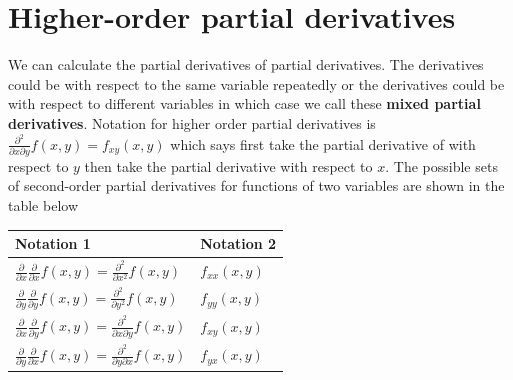 \documentclass[
]{book}
\theoremstyle{definition}
\theoremstyle{definition}
\theoremstyle{definition}
\theoremstyle{remark}
\begin{document}
\hypertarget{higher-order-partial-derivatives}{%
\section{Higher-order partial derivatives}\label{higher-order-partial-derivatives}}

We can calculate the partial derivatives of partial derivatives. The derivatives could be with respect to the same variable repeatedly or the derivatives could be with respect to different variables in which case we call these \textbf{mixed partial derivatives}. Notation for higher order partial derivatives is \(\frac{\partial^2}{\partial x \partial y} f(x, y) = f_{xy}(x, y)\) which says first take the partial derivative of with respect to \(y\) then take the partial derivative with respect to \(x\). The possible sets of second-order partial derivatives for functions of two variables are shown in the table below

\begin{longtable}[]{@{}ll@{}}
\toprule
\begin{minipage}[b]{0.47\columnwidth}\raggedright
Notation 1\strut
\end{minipage} & \begin{minipage}[b]{0.47\columnwidth}\raggedright
Notation 2\strut
\end{minipage}\tabularnewline
\midrule
\endhead
\begin{minipage}[t]{0.47\columnwidth}\raggedright
\(\frac{\partial}{\partial x}\frac{\partial}{\partial x} f(x, y) = \frac{\partial^2}{\partial x^2} f(x, y)\)\strut
\end{minipage} & \begin{minipage}[t]{0.47\columnwidth}\raggedright
\(f_{xx}(x, y)\)\strut
\end{minipage}\tabularnewline
\begin{minipage}[t]{0.47\columnwidth}\raggedright
\(\frac{\partial}{\partial y}\frac{\partial}{\partial y} f(x, y) = \frac{\partial^2}{\partial y^2} f(x, y)\)\strut
\end{minipage} & \begin{minipage}[t]{0.47\columnwidth}\raggedright
\(f_{yy}(x, y)\)\strut
\end{minipage}\tabularnewline
\begin{minipage}[t]{0.47\columnwidth}\raggedright
\(\frac{\partial}{\partial x}\frac{\partial}{\partial y} f(x, y) = \frac{\partial^2}{\partial x \partial y} f(x, y)\)\strut
\end{minipage} & \begin{minipage}[t]{0.47\columnwidth}\raggedright
\(f_{xy}(x, y)\)\strut
\end{minipage}\tabularnewline
\begin{minipage}[t]{0.47\columnwidth}\raggedright
\(\frac{\partial}{\partial y}\frac{\partial}{\partial x} f(x, y) = \frac{\partial^2}{\partial y \partial x} f(x, y)\)\strut
\end{minipage} & \begin{minipage}[t]{0.47\columnwidth}\raggedright
\(f_{yx}(x, y)\)\strut
\end{minipage}\tabularnewline
\bottomrule
\end{longtable}
\end{document}
